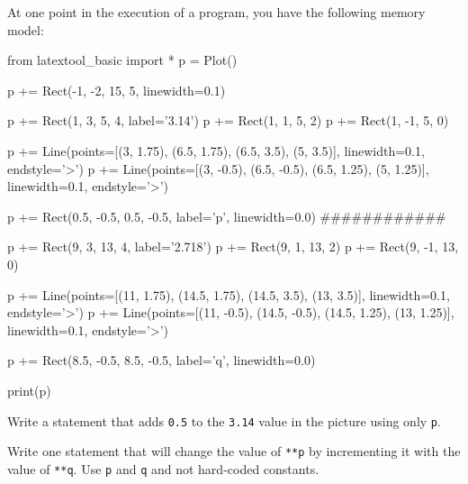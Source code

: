 \begin{ex}
At one point in the execution of a program, you have the following memory model:
\begin{python}
from latextool_basic import *
p = Plot()

p += Rect(-1, -2, 15, 5, linewidth=0.1)

p += Rect(1, 3, 5, 4, label='3.14')
p += Rect(1, 1, 5, 2)
p += Rect(1, -1, 5, 0)

p += Line(points=[(3, 1.75), (6.5, 1.75), (6.5, 3.5), (5, 3.5)],
          linewidth=0.1, endstyle='>')
p += Line(points=[(3, -0.5), (6.5, -0.5), (6.5, 1.25), (5, 1.25)],
          linewidth=0.1, endstyle='>')

p += Rect(0.5, -0.5, 0.5, -0.5, label='p', linewidth=0.0)
############

p += Rect(9, 3, 13, 4, label='2.718')
p += Rect(9, 1, 13, 2)
p += Rect(9, -1, 13, 0)

p += Line(points=[(11, 1.75), (14.5, 1.75), (14.5, 3.5), (13, 3.5)],
          linewidth=0.1, endstyle='>')
p += Line(points=[(11, -0.5), (14.5, -0.5), (14.5, 1.25), (13, 1.25)],
          linewidth=0.1, endstyle='>')

p += Rect(8.5, -0.5, 8.5, -0.5, label='q', linewidth=0.0)

print(p)
\end{python}

Write a statement that adds \texttt{0.5} to the \texttt{3.14} value in the picture using only \texttt{p}.
\end{ex}

\begin{ex}
Write one statement that will change the value of \texttt{**p} by incrementing it with the value of \texttt{**q}. Use \texttt{p} and \texttt{q} and not hard-coded constants.
\end{ex}

